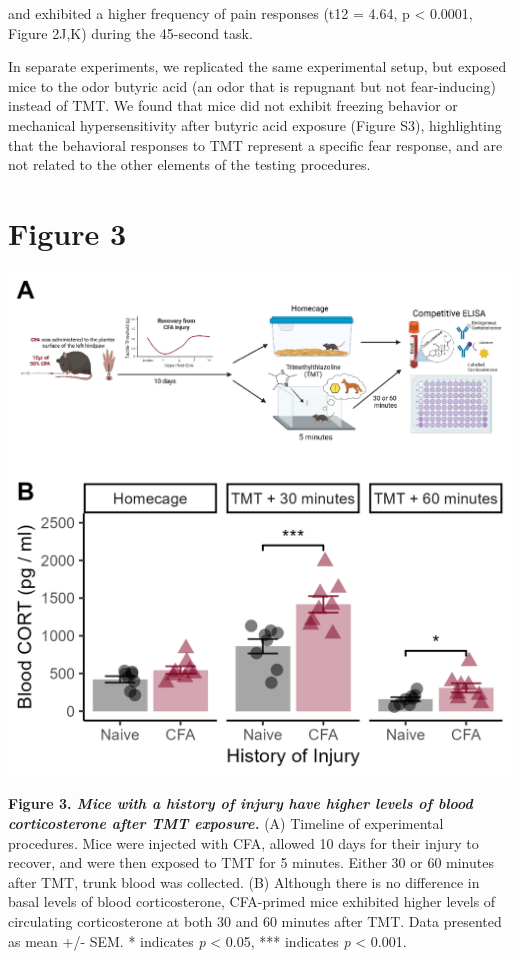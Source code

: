 \documentclass[
]{book}
\begin{document}
and exhibited a higher frequency of pain responses (t12 = 4.64, p \textless{} 0.0001, Figure 2J,K) during the 45-second task.

In separate experiments, we replicated the same experimental setup, but exposed mice to the odor butyric acid (an odor that is repugnant but not fear-inducing) instead of TMT. We found that mice did not exhibit freezing behavior or mechanical hypersensitivity after butyric acid exposure (Figure S3), highlighting that the behavioral responses to TMT represent a specific fear response, and are not related to the other elements of the testing procedures.

\chapter*{Figure 3}\label{figure-3}

\includegraphics[width=16.67in]{Figs/3_CORT}

\textbf{Figure 3. \emph{Mice with a history of injury have higher levels of blood corticosterone after TMT exposure.}} (A) Timeline of experimental procedures. Mice were injected with CFA, allowed 10 days for their injury to recover, and were then exposed to TMT for 5 minutes. Either 30 or 60 minutes after TMT, trunk blood was collected. (B) Although there is no difference in basal levels of blood corticosterone, CFA-primed mice exhibited higher levels of circulating corticosterone at both 30 and 60 minutes after TMT. Data presented as mean +/- SEM. * indicates \emph{p} \textless{} 0.05, *** indicates \emph{p} \textless{} 0.001.
\end{document}
